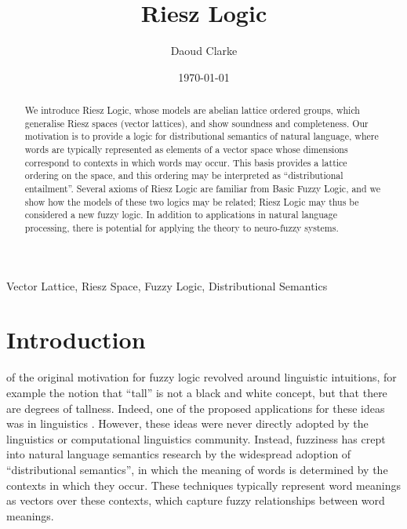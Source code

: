 \documentclass[journal,draftcls,onecolumn]{IEEEtran}
\author{Daoud Clarke}
\date{\today}
\title{Riesz Logic}
\theoremstyle{definition}
\begin{document}



\maketitle

\begin{abstract}
We introduce Riesz Logic, whose models are abelian lattice ordered
groups, which generalise Riesz spaces (vector lattices), and show
soundness and completeness. Our motivation is to provide a logic for
distributional semantics of natural language, where words are
typically represented as elements of a vector space whose dimensions
correspond to contexts in which words may occur. This basis provides a
lattice ordering on the space, and this ordering may be interpreted as
``distributional entailment''. Several axioms of Riesz Logic are
familiar from Basic Fuzzy Logic, and we show how the models of these
two logics may be related; Riesz Logic may thus be considered a new
fuzzy logic. In addition to applications in natural language
processing, there is potential for applying the theory to neuro-fuzzy
systems.
\end{abstract}

\begin{IEEEkeywords}
Vector Lattice, Riesz Space, Fuzzy Logic, Distributional Semantics
\end{IEEEkeywords}


\section{Introduction}

 of the original motivation for fuzzy logic revolved around
linguistic intuitions, for example the notion that ``tall'' is not a
black and white concept, but that there are degrees of
tallness. Indeed, one of the proposed applications for these ideas was
in linguistics \cite{Zadeh:73}. However, these ideas were never
directly adopted by the linguistics or computational linguistics
community. Instead, fuzziness has crept into natural language
semantics research by the widespread adoption of ``distributional
semantics'', in which the meaning of words is determined by the
contexts in which they occur. These techniques typically represent
word meanings as vectors over these contexts, which capture fuzzy
relationships between word meanings.
\end{document}
